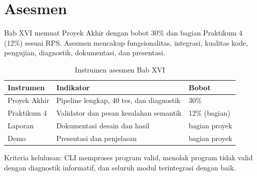 \section*{Asesmen}

Bab XVI memuat Proyek Akhir dengan bobot 30\% dan bagian Praktikum 4
(12\%) sesuai RPS. Asesmen mencakup fungsionalitas, integrasi,
kualitas kode, pengujian, diagnostik, dokumentasi, dan presentasi.

\begin{table}[H]
\centering
\caption{Instrumen asesmen Bab XVI}
\label{tab:ch16-asesmen}
\begin{tabularx}{\textwidth}{@{}lXl@{}}
\toprule
\textbf{Instrumen} & \textbf{Indikator} & \textbf{Bobot} \\
\midrule
Proyek Akhir & Pipeline lengkap, 40 tes, dan diagnostik & 30\% \\
Praktikum 4 & Validator dan pesan kesalahan semantik &
12\% (bagian) \\
Laporan & Dokumentasi desain dan hasil & bagian proyek \\
Demo & Presentasi dan penjelasan & bagian proyek \\
\bottomrule
\end{tabularx}
\end{table}

Kriteria kelulusan: CLI memproses program valid, menolak program tidak
valid dengan diagnostik informatif, dan seluruh modul terintegrasi
dengan baik.
